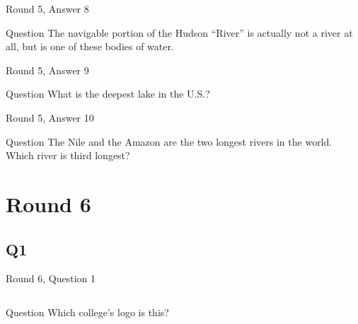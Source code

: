 \documentclass[11pt]{beamer}
\begin{document}
\begin{frame}[t]{Round 5, Answer 8}
\begin{block}{Question}
The navigable portion of the Hudson ``River'' is actually not a river at all, but is one of these bodies of water.
\end{block}
\end{frame}
\begin{frame}[t]{Round 5, Answer 9}
\begin{block}{Question}
What is the deepest lake in the U.S.?
\end{block}
\end{frame}
\begin{frame}[t]{Round 5, Answer 10}
\begin{block}{Question}
The Nile and the Amazon are the two longest rivers in the world. Which river is third longest?
\end{block}
\end{frame}
\def\thisSectionName{Logos}
\section{Round 6}
\subsection*{Q1}
\begin{frame}[t]{Round 6, Question 1}
\begin{columns}[T,totalwidth=\linewidth]
\begin{column}{0.32\linewidth}
\begin{block}{Question}
Which college's logo is this?
\end{block}
\end{column}
\begin{column}{0.65\linewidth}
\begin{center}
\texttt{[image: \{Images/cornell]}.png}
\end{center}
\end{column}
\end{columns}
\end{frame}
\end{document}
